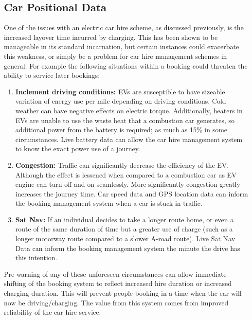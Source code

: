 \documentclass[conference]{IEEEtran}
\begin{document}


\subsection{Car Positional Data}

One of the issues with an electric car hire scheme, as discussed
previously, is the increased layover time incurred by charging. This
has been shown to be manageable in its standard incarnation, but
certain instances could exacerbate this weakness, or simply be a
problem for car hire management schemes in general. For example the
following situations within a booking could threaten the ability to
service later bookings:

\begin{enumerate}
\item {\textbf{Inclement driving conditions:}} EVs are susceptible to
  have sizeable variation of energy use per mile depending on driving
  conditions. Cold weather can have negative effects on electric
  torque. Additionally, heaters in EVs are unable to use the waste
  heat that a combustion car generates, so additional power from the
  battery is required; as much as 15\% in some circumstances. Live
  battery data can allow the car hire management system to know the
  exact power use of a journey.
\item {\textbf{Congestion:}} Traffic can significantly decrease the
  efficiency of the EV. Although the effect is lessened when compared
  to a combustion car as EV engine can turn off and on
  seamlessly. More significantly congestion greatly increases the
  journey time. Car speed data and GPS location data can inform the
  booking management system when a car is stuck in traffic.
\item {\textbf{Sat Nav:}} If an individual decides to take a longer
  route home, or even a route of the same duration of time but a
  greater use of charge (such as a longer motorway route compared to a
  slower A-road route). Live Sat Nav Data can inform the booking
  management system the minute the drive has this intention. 
\end{enumerate}

Pre-warning of any of these unforeseen circumstances can allow
immediate shifting of the booking system to reflect increased hire
duration or increased charging duration. This will prevent people
booking in a time when the car will now be driving/charging. The value
from this system comes from improved reliability of the car hire
service.
\end{document}
